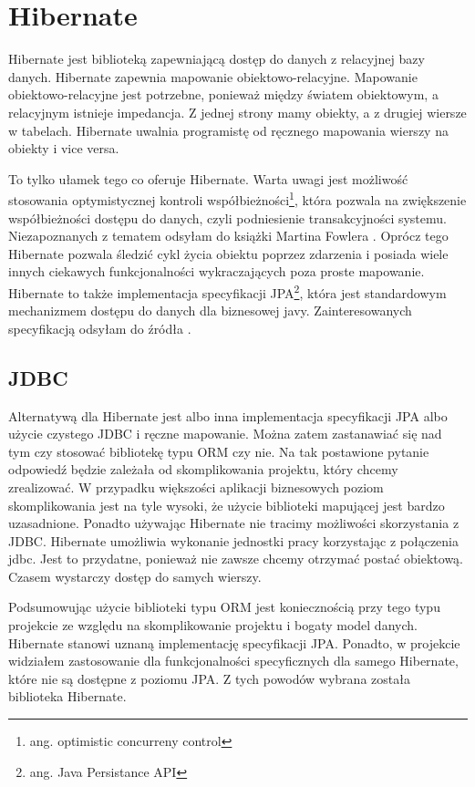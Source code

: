 \documentclass[a4paper,onecolumn,oneside,11pt,wide,floatssmall]{mwrep}
\theoremstyle{definition}
\theoremstyle{plain}%
\theoremstyle{remark}
\begin{document}
\section{Hibernate}
Hibernate \cite{hibernateHome} jest biblioteką zapewniającą dostęp do danych z relacyjnej bazy danych. Hibernate zapewnia mapowanie obiektowo-relacyjne. Mapowanie obiektowo-relacyjne jest potrzebne, ponieważ między światem obiektowym, a relacyjnym istnieje impedancja. Z jednej strony mamy obiekty, a z drugiej wiersze w tabelach. Hibernate uwalnia programistę od ręcznego mapowania wierszy na obiekty i vice versa. 

To tylko ułamek tego co oferuje Hibernate. Warta uwagi jest możliwość stosowania optymistycznej kontroli współbieżności\footnote{ang. optimistic concurreny control}, która pozwala na zwiększenie współbieżności dostępu do danych, czyli podniesienie transakcyjności systemu. Niezapoznanych z tematem odsyłam do książki Martina Fowlera \cite[str. 76]{fowler2003patterns}.
 Oprócz tego Hibernate pozwala śledzić cykl życia obiektu poprzez zdarzenia i posiada wiele innych ciekawych funkcjonalności wykraczających poza proste mapowanie.
Hibernate to także implementacja specyfikacji JPA\footnote{ang. Java Persistance API}, która jest standardowym mechanizmem dostępu do danych dla biznesowej javy. Zainteresowanych specyfikacją odsyłam do źródła \cite{jpa2.0}.

\subsection{JDBC}
Alternatywą dla Hibernate jest albo inna implementacja specyfikacji JPA albo użycie czystego JDBC i ręczne mapowanie. Można zatem zastanawiać się nad tym czy stosować bibliotekę typu ORM czy nie. Na tak postawione pytanie odpowiedź będzie zależała od skomplikowania projektu, który chcemy zrealizować. W przypadku większości aplikacji biznesowych poziom skomplikowania jest na tyle wysoki, że użycie biblioteki mapującej jest bardzo uzasadnione. Ponadto używając Hibernate nie tracimy możliwości skorzystania z JDBC. Hibernate umożliwia wykonanie jednostki pracy korzystając z połączenia jdbc. Jest to przydatne, ponieważ nie zawsze chcemy otrzymać postać obiektową. Czasem wystarczy dostęp do samych wierszy.

Podsumowując użycie biblioteki typu ORM jest koniecznością przy tego typu projekcie ze względu na skomplikowanie projektu i bogaty model danych. Hibernate stanowi uznaną implementację specyfikacji JPA. Ponadto, w projekcie widziałem zastosowanie dla funkcjonalności specyficznych dla samego Hibernate, które nie są dostępne z poziomu JPA. Z tych powodów wybrana została biblioteka Hibernate.
\end{document}
